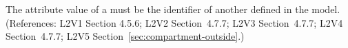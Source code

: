 The  attribute value of a \Compartment must be the identifier of
another \Compartment defined in the model.  (References: L2V1 Section
4.5.6; L2V2 Section~4.7.7; L2V3 Section~4.7.7; L2V4 Section~4.7.7; L2V5 Section~\ref{sec:compartment-outside}.)
